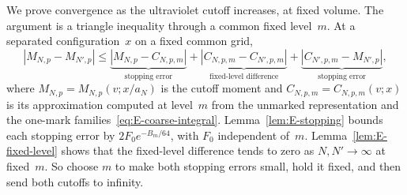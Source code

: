 We prove convergence as the ultraviolet cutoff increases, at fixed volume. The argument is a triangle inequality through a common fixed level~$m$. At a separated configuration~$x$ on a fixed common grid,
\begin{equation}\label{eq:E-three-term}
|M_{N,p}-M_{N',p}|\le
\underbrace{|M_{N,p}-C_{N,p,m}|}_{\text{stopping error}}
+\underbrace{|C_{N,p,m}-C_{N',p,m}|}_{\text{fixed-level difference}}
+\underbrace{|C_{N',p,m}-M_{N',p}|}_{\text{stopping error}},
\end{equation}
where $M_{N,p}=M_{N,p}(v;x/a_N)$ is the cutoff moment and $C_{N,p,m}=C_{N,p,m}(v;x)$ is its approximation computed at level~$m$ from the unmarked representation and the one-mark families~\eqref{eq:E-coarse-integral}. Lemma~\ref{lem:E-stopping} bounds each stopping error by $2F_0e^{-B_m/64}$, with $F_0$ independent of~$m$. Lemma~\ref{lem:E-fixed-level} shows that the fixed-level difference tends to zero as $N,N'\to\infty$ at fixed~$m$. So choose $m$ to make both stopping errors small, hold it fixed, and then send both cutoffs to infinity.

